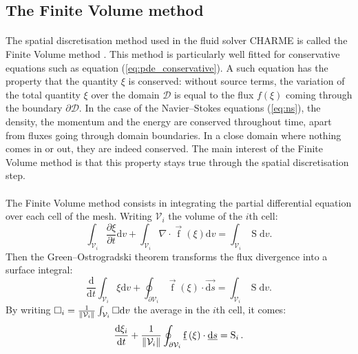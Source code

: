     \subsection{The Finite Volume method}

      \paragraph{}
      The spatial discretisation method used in the fluid solver CHARME is called the Finite Volume method \cite{EymardGallouetHerbin2000, Leterrier2003}.
      This method is particularly well fitted for conservative equations such as equation (\ref{eq:pde_conservative}).
      A such equation has the property that the quantity $\xi$ is conserved: without source terms, the variation of the total quantity $\xi$ over the domain $\mathcal{D}$ is equal to the flux $f\left(\xi\right)$ coming through the boundary $\partial\mathcal{D}$.
      In the case of the Navier--Stokes equations (\ref{eq:ns}), the density, the momentum and the energy are conserved throughout time, apart from fluxes going through domain boundaries.
      In a close domain where nothing comes in or out, they are indeed conserved.
      The main interest of the Finite Volume method is that this property stays true through the spatial discretisation step.

      \paragraph{}
      The Finite Volume method consists in integrating the partial differential equation over each cell of the mesh.
      Writing $\mathcal{V}_i$ the volume of the $i$th cell:
      \begin{equation}
        \int_{\mathcal{V}_i} \frac{\partial \xi}{\partial t} \mathrm{d}v + \int_{\mathcal{V}_i} \nabla\cdot \vec{\operatorname{f}}\left(\xi\right) \mathrm{d}v = \int_{\mathcal{V}_i} \operatorname{S} \mathrm{d}v .
      \end{equation}
      Then the Green--Ostrogradski theorem transforms the flux divergence into a surface integral:
      \begin{equation}
        \frac{\mathrm{d}}{\mathrm{d} t} \int_{\mathcal{V}_i} \xi\mathrm{d}v + \oint_{\partial\mathcal{V}_i} \vec{\operatorname{f}}\left(\xi\right) \cdot \vec{\mathrm{d}s} = \int_{\mathcal{V}_i} \operatorname{S} \mathrm{d}v .
      \end{equation}
      By writing $\square_i = \frac{1}{\norm{\mathcal{V}_i}} \int_{\mathcal{V}_i} \square \mathrm{d}v$ the average in the $i$th cell, it comes:
      \begin{equation}
        \frac{\mathrm{d}\xi_i}{\mathrm{d} t}  + \frac{1}{\norm{\mathcal{V}_i}} \oint_{\partial\mathcal{V}_i} \vec{\operatorname{f}}\left(\xi\right) \cdot \vec{\mathrm{d}s} = \operatorname{S}_i .
      \end{equation}

